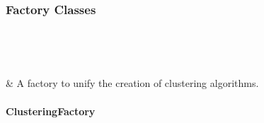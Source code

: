 \documentclass[letterpaper,10pt,english]{sphinxmanual}
\begin{document}
\subsubsection{Factory Classes}
\label{\detokenize{api/directional_clustering.clustering:factory-classes}}

\begin{savenotes}\sphinxatlongtablestart\begin{longtable}[c]{}
\hline

\endfirsthead

%
{}\\
\hline

\endhead

\hline
{}\\
\endfoot

\endlastfoot

{\hyperref[\detokenize{api/generated/directional_clustering.clustering.ClusteringFactory:directional_clustering.clustering.ClusteringFactory}]{}}
&
A factory to unify the creation of clustering algorithms.
\\
\hline
\end{longtable}\sphinxatlongtableend\end{savenotes}


\paragraph{ClusteringFactory}
\label{\detokenize{api/generated/directional_clustering.clustering.ClusteringFactory:clusteringfactory}}\label{\detokenize{api/generated/directional_clustering.clustering.ClusteringFactory::doc}}
\end{document}
